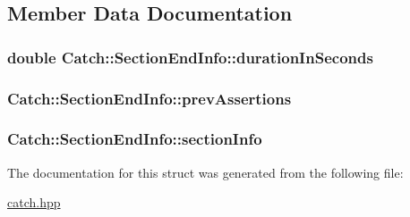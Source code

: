 \subsection{Member Data Documentation}
\hypertarget{struct_catch_1_1_section_end_info_a7c262f2dab9cff166b8eca620c47eea5}{
\subsubsection[{duration\-In\-Seconds}]{\setlength{\rightskip}{0pt plus 5cm}double Catch\-::\-Section\-End\-Info\-::duration\-In\-Seconds}}\label{struct_catch_1_1_section_end_info_a7c262f2dab9cff166b8eca620c47eea5}
\hypertarget{struct_catch_1_1_section_end_info_ae70b154cbc05b5dd2901d97f89303d8c}{
\subsubsection[{prev\-Assertions}]{ Catch\-::\-Section\-End\-Info\-::prev\-Assertions}}\label{struct_catch_1_1_section_end_info_ae70b154cbc05b5dd2901d97f89303d8c}
\hypertarget{struct_catch_1_1_section_end_info_a2d44793392cb83735d086d726822abe9}{
\subsubsection[{section\-Info}]{ Catch\-::\-Section\-End\-Info\-::section\-Info}}\label{struct_catch_1_1_section_end_info_a2d44793392cb83735d086d726822abe9}


The documentation for this struct was generated from the following file\-:\begin{DoxyCompactItemize}
\item 
\hyperlink{catch_8hpp}{catch.\-hpp}\end{DoxyCompactItemize}
